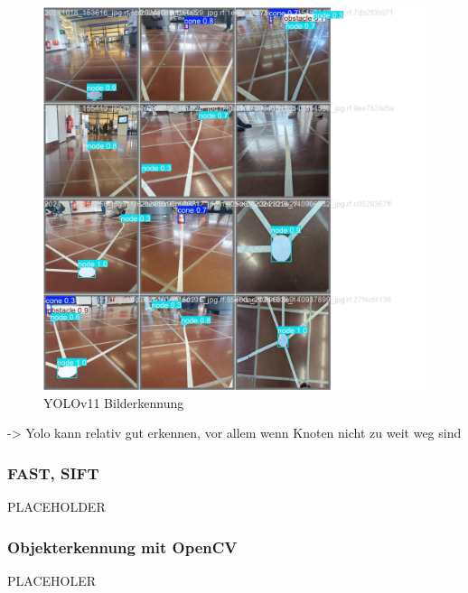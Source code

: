 \begin{figure}[H]
\centering
\includegraphics[width=\textwidth -30mm]{assets/informatik-prototyp/yolo/recognized-images.jpeg}
\caption{YOLOv11 Bilderkennung}
\label{fig:img-recognition-yolo}
\end{figure}

-> Yolo kann relativ gut erkennen, vor allem wenn Knoten nicht zu weit weg sind


\subsubsection{FAST, SIFT}

PLACEHOLDER

\subsubsection{Objekterkennung mit OpenCV}

PLACEHOLER